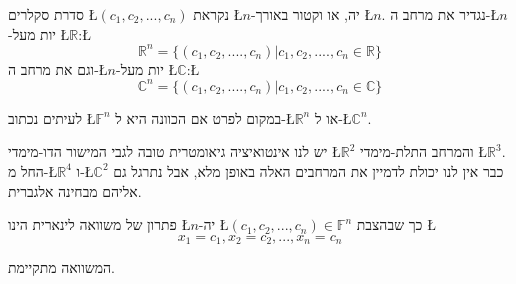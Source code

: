 \begin{hdef}
סדרת סקלרים \L{$(c_{1},c_{2},...,c_{n})$} נקראת \L{$n$}-יה,
או וקטור באורך \L{$n$}. נגדיר את מרחב ה-\L{$n$}-יות מעל \L{$\mathbb{\mathbb{R}}$}:\L{%
\[
\mathbb{R}^{n}=\{(c_{1},c_{2},....,c_{n})|c_{1},c_{2},....,c_{n}\in\mathbb{R}\}
\]
}%
 וגם את מרחב ה-\L{$n$}-יות מעל \L{$\mathbb{\mathbb{C}}$}:\L{%
\[
\mathbb{\mathbb{C}}^{n}=\{(c_{1},c_{2},....,c_{n})|c_{1},c_{2},....,c_{n}\in\mathbb{\mathbb{C}}\}
\]
}%

לעיתים נכתוב \L{$\mathbb{F}^{n}$} במקום לפרט אם הכוונה היא ל-\L{$\mathbb{R}^{n}$}
או ל-\L{$\mathbb{C}^{n}$}.
\end{hdef}

יש לנו אינטואיציה גיאומטרית טובה לגבי המישור הדו-מימדי \L{$\mathbb{R}^{2}$}
והמרחב התלת-מימדי \L{$\mathbb{R}^{3}$}. החל מ-\L{$\mathbb{R}^{4}$}
ו-\L{$\mathbb{C}^{2}$} כבר אין לנו יכולת לדמיין את המרחבים האלה באופן
מלא, אבל נתרגל גם אליהם מבחינה אלגברית.

\begin{hdef}
פתרון של משוואה לינארית הינו \L{$n$}-יה \L{$(c_{1},c_{2},...,c_{n})\in\mathbb{F}^{n}$}
כך שבהצבת \L{%
\[
x_{1}=c_{1},x_{2}=c_{2},...,x_{n}=c_{n}
\]
}%

המשוואה מתקיימת.
\end{hdef}

